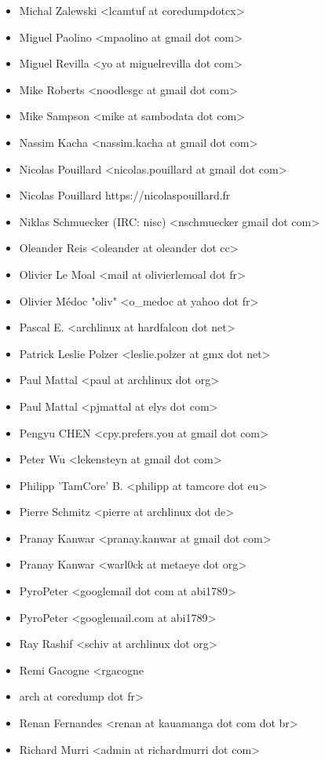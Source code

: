 \begin{itemize}
\item  Michal Zalewski <lcamtuf at coredumpdotcx>
\item  Miguel Paolino <mpaolino at gmail dot com>
\item  Miguel Revilla <yo at miguelrevilla dot com>
\item  Mike Roberts <noodlesgc at gmail dot com>
\item  Mike Sampson <mike at sambodata dot com>
\item  Nassim Kacha <nassim.kacha at gmail dot com>
\item  Nicolas Pouillard <nicolas.pouillard at gmail dot com>
\item  Nicolas Pouillard https://nicolaspouillard.fr
\item  Niklas Schmuecker (IRC: nisc) <nschmuecker gmail dot com>
\item  Oleander Reis <oleander at oleander dot cc>
\item  Olivier Le Moal <mail at olivierlemoal dot fr>
\item  Olivier Médoc "oliv" <o\_medoc at yahoo dot fr>
\item  Pascal E. <archlinux at hardfalcon dot net>
\item  Patrick Leslie Polzer <leslie.polzer at gmx dot net>
\item  Paul Mattal <paul at archlinux dot org>
\item  Paul Mattal <pjmattal at elys dot com>
\item  Pengyu CHEN <cpy.prefers.you at gmail dot com>
\item  Peter Wu <lekensteyn at gmail dot com>
\item  Philipp 'TamCore' B. <philipp at tamcore dot eu>
\item  Pierre Schmitz <pierre at archlinux dot de>
\item  Pranay Kanwar <pranay.kanwar at gmail dot com>
\item  Pranay Kanwar <warl0ck at metaeye dot org>
\item  PyroPeter <googlemail dot com at abi1789>
\item  PyroPeter <googlemail.com at abi1789>
\item  Ray Rashif <schiv at archlinux dot org>
\item  Remi Gacogne <rgacogne\item arch at coredump dot fr>
\item  Renan Fernandes <renan at kauamanga dot com dot br>
\item  Richard Murri <admin at richardmurri dot com>

\end{itemize}
